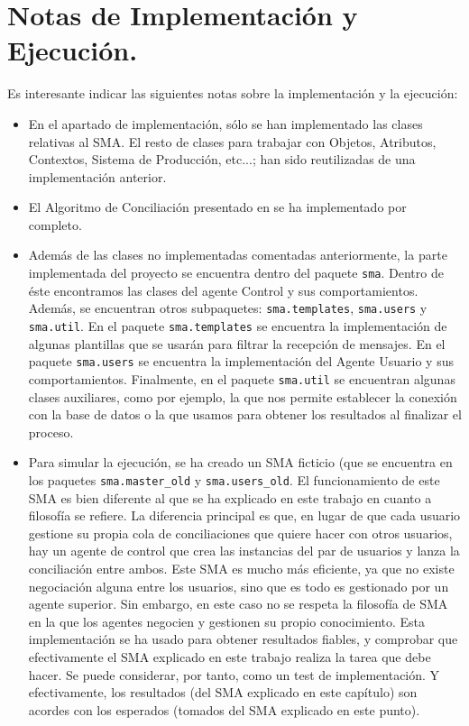 \section{Notas de Implementación y Ejecución.}

Es interesante indicar las siguientes notas sobre la implementación y la ejecución:

\begin{itemize}
	\item En el apartado de implementación, sólo se han implementado las clases relativas al SMA. El resto de clases para trabajar con Objetos, Atributos, Contextos, Sistema de Producción, etc...; han sido reutilizadas de una implementación anterior.
	\item El Algoritmo de Conciliación presentado en \cite{algoritmo} se ha implementado por completo.
	\item Además de las clases no implementadas comentadas anteriormente, la parte implementada del proyecto se encuentra dentro del paquete {\tt sma}. Dentro de éste encontramos las clases del agente Control y sus comportamientos. Además, se encuentran otros subpaquetes: {\tt sma.templates}, {\tt sma.users} y {\tt sma.util}. En el paquete {\tt sma.templates} se encuentra la implementación de algunas plantillas que se usarán para filtrar la recepción de mensajes. En el paquete {\tt sma.users} se encuentra la implementación del Agente Usuario y sus comportamientos. Finalmente, en el paquete {\tt sma.util} se encuentran algunas clases auxiliares, como por ejemplo, la que nos permite establecer la conexión con la base de datos o la que usamos para obtener los resultados al finalizar el proceso.
	\item Para simular la ejecución, se ha creado un SMA ficticio (que se encuentra en los paquetes {\tt sma.master\_old} y {\tt sma.users\_old}. El funcionamiento de este SMA es bien diferente al que se ha explicado en este trabajo en cuanto a filosofía se refiere. La diferencia principal es que, en lugar de que cada usuario gestione su propia cola de conciliaciones que quiere hacer con otros usuarios, hay un agente de control que crea las instancias del par de usuarios y lanza la conciliación entre ambos. Este SMA es mucho más eficiente, ya que no existe negociación alguna entre los usuarios, sino que es todo es gestionado por un agente superior. Sin embargo, en este caso no se respeta la filosofía de SMA en la que los agentes negocien y gestionen su propio conocimiento. Esta implementación se ha usado para obtener resultados fiables, y comprobar que efectivamente el SMA explicado en este trabajo realiza la tarea que debe hacer. Se puede considerar, por tanto, como un test de implementación. Y efectivamente, los resultados (del SMA explicado en este capítulo) son acordes con los esperados (tomados del SMA explicado en este punto).

\end{itemize}
